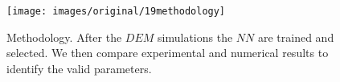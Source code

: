 \begin{figure}[!htb] 
\centering 
\texttt{[image: images/original/19methodology]} 
\caption[Methodology]{Methodology. After the $DEM$ simulations the $NN$ are
trained and selected. We then compare experimental and numerical results to
identify the valid parameters.}
\label{fig:19methodology} 
\end{figure}



